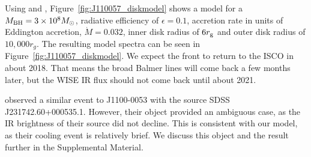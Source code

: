 \documentclass{nature}
\begin{document}
Using \cite{Ford2018} and \cite{Sirko_Goodman2003},
Figure~\ref{fig:J110057_diskmodel} shows a model for a $M_{\rm
BH}=3\times 10^{8} M_{\odot}$, radiative efficiency of $\epsilon=0.1$,
accretion rate in units of Eddington accretion, $\dot{M}=0.032$, inner
disk radius of $6r_{\rm g}$ and outer disk radius of $10,000 r_{g}$. The resulting model spectra can be seen in
Figure~\ref{fig:J110057_diskmodel}.  We expect the front to return to
the ISCO in about 2018. That means the broad Balmer lines will come back a few
months later, but the WISE IR flux should not come back until about
2021.

\cite{Guo2016} observed a similar event to J1100-0053 with the source
SDSS J231742.60+000535.1. However, their object provided an ambiguous
case, as the IR brightness of their source did not decline. This is consistent with our model, as their cooling event is
relatively brief.  We discuss this object and the \cite{Guo2016} result
further in the Supplemental Material.




%

%
\end{document}
